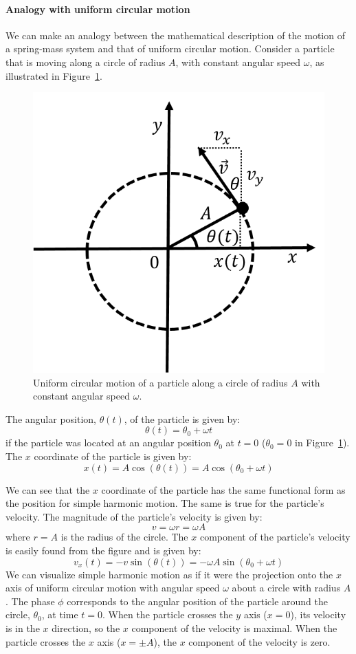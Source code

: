 \paragraph{Analogy with uniform circular motion}

We can make an analogy between the mathematical description of the motion of a spring-mass system and that of uniform circular motion. Consider a particle that is moving along a circle of radius $A$, with constant angular speed $\omega$, as illustrated in Figure~\ref{fig:simpleharmonicmotion:circleshm}.

\begin{figure}[!htbp]
\centering
\includegraphics[width=0.4\linewidth]{files/circleshm-4fbc6d730682c8b2591f53fdde89cb8a.png}
\caption[]{Uniform circular motion of a particle along a circle of radius $A$ with constant angular speed $\omega$.}
\label{fig:simpleharmonicmotion:circleshm}
\end{figure}

The angular position, $\theta(t)$, of the particle is given by:
\begin{equation}
\theta(t) = \theta_0 + \omega t
\end{equation}
if the particle was located at an angular position $\theta_0$ at $t=0$ ($\theta_0=0$ in Figure~\ref{fig:simpleharmonicmotion:circleshm}). The $x$ coordinate of the particle is given by:
\begin{equation}
x(t) = A\cos(\theta(t)) = A\cos(\theta_0 + \omega t)
\end{equation}

We can see that the $x$ coordinate of the particle has the same functional form as the position for simple harmonic motion. The same is true for the particle's velocity. The magnitude of the particle's velocity is given by:
\begin{equation}
v = \omega r = \omega A
\end{equation}
where $r=A$ is the radius of the circle. The $x$ component of the particle's velocity is easily found from the figure and is given by:
\begin{equation}
v_x(t) = -v\sin(\theta(t)) = -\omega A\sin(\theta_0 + \omega t)
\end{equation}
We can visualize simple harmonic motion as if it were the projection onto the $x$ axis of uniform circular motion with angular speed $\omega$ about a circle with radius $A$. The phase $\phi$ corresponds to the angular position of the particle around the circle, $\theta_0$, at time $t=0$. When the particle crosses the $y$ axis ($x=0$), its velocity is in the $x$ direction, so the $x$ component of the velocity is maximal. When the particle crosses the $x$ axis ($x=\pm A$), the $x$ component of the velocity is zero.


